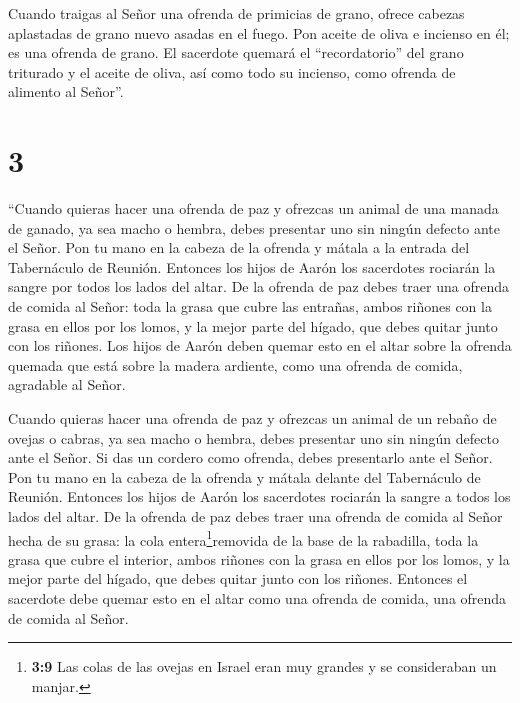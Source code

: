  Cuando traigas al Señor una ofrenda de primicias de grano,
ofrece cabezas aplastadas de grano nuevo asadas en el fuego.
 Pon aceite de oliva e incienso en él; es una ofrenda de
grano.  El sacerdote quemará el ``recordatorio'' del grano
triturado y el aceite de oliva, así como todo su incienso, como ofrenda
de alimento al Señor''.

\hypertarget{section-2}{%
\section{3}\label{section-2}}

 ``Cuando quieras hacer una ofrenda de paz y ofrezcas un
animal de una manada de ganado, ya sea macho o hembra, debes presentar
uno sin ningún defecto ante el Señor.  Pon tu mano en la
cabeza de la ofrenda y mátala a la entrada del Tabernáculo de Reunión.
Entonces los hijos de Aarón los sacerdotes rociarán la sangre por todos
los lados del altar.  De la ofrenda de paz debes traer una
ofrenda de comida al Señor: toda la grasa que cubre las entrañas,
 ambos riñones con la grasa en ellos por los lomos, y la
mejor parte del hígado, que debes quitar junto con los riñones.
 Los hijos de Aarón deben quemar esto en el altar sobre la
ofrenda quemada que está sobre la madera ardiente, como una ofrenda de
comida, agradable al Señor.

 Cuando quieras hacer una ofrenda de paz y ofrezcas un
animal de un rebaño de ovejas o cabras, ya sea macho o hembra, debes
presentar uno sin ningún defecto ante el Señor.  Si das un
cordero como ofrenda, debes presentarlo ante el Señor.  Pon
tu mano en la cabeza de la ofrenda y mátala delante del Tabernáculo de
Reunión. Entonces los hijos de Aarón los sacerdotes rociarán la sangre a
todos los lados del altar.  De la ofrenda de paz debes traer
una ofrenda de comida al Señor hecha de su grasa: la cola
entera\footnote{\textbf{3:9} Las colas de las ovejas en Israel eran muy
  grandes y se consideraban un manjar.}removida de la base de la
rabadilla, toda la grasa que cubre el interior,  ambos
riñones con la grasa en ellos por los lomos, y la mejor parte del
hígado, que debes quitar junto con los riñones.  Entonces
el sacerdote debe quemar esto en el altar como una ofrenda de comida,
una ofrenda de comida al Señor.

